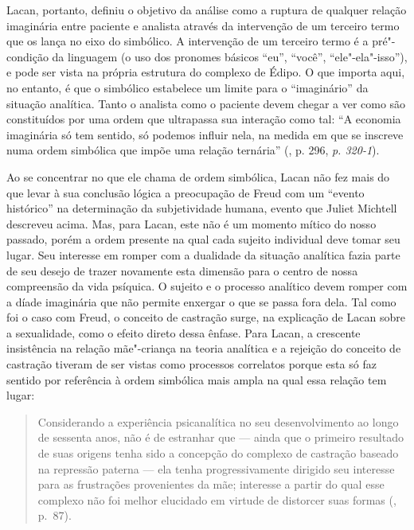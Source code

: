 Lacan, portanto, definiu o objetivo da análise como a ruptura de
qualquer relação imaginária entre paciente e analista através da
intervenção de um terceiro termo que os lança no eixo do simbólico. A
intervenção de um terceiro termo é a pré"-condição da linguagem (o uso
dos pronomes básicos ``eu'', ``você'', ``ele"-ela"-isso''), e pode ser
vista na própria estrutura do complexo de Édipo. O que importa aqui, no
entanto, é que o simbólico estabelece um limite para o ``imaginário'' da
situação analítica. Tanto o analista como o paciente devem chegar a ver
como são constituídos por uma ordem que ultrapassa sua interação como
tal: ``A economia imaginária só tem sentido, só podemos influir nela, na
medida em que se inscreve numa ordem simbólica que impõe uma relação
ternária'' (, p. 296, \emph{p. 320-1}).

Ao se concentrar no que ele chama de ordem simbólica, Lacan não fez mais
do que levar à sua conclusão lógica a preocupação de Freud com um
``evento histórico'' na determinação da subjetividade humana, evento que
Juliet Michtell descreveu acima. Mas, para Lacan, este não é um momento
mítico do nosso passado, porém a ordem presente na qual cada sujeito
individual deve tomar seu lugar. Seu interesse em romper com a dualidade
da situação analítica fazia parte de seu desejo de trazer novamente esta
dimensão para o centro de nossa compreensão da vida psíquica. O sujeito
e o processo analítico devem romper com a díade imaginária que não
permite enxergar o que se passa fora dela. Tal como foi o caso com
Freud, o conceito de castração surge, na explicação de Lacan sobre a
sexualidade, como o efeito direto dessa ênfase. Para Lacan, a crescente
insistência na relação mãe"-criança na teoria analítica e a rejeição do
conceito de castração tiveram de ser vistas como processos correlatos
porque esta só faz sentido por referência à ordem simbólica mais ampla
na qual essa relação tem lugar:

\begin{quote}
Considerando a experiência psicanalítica no seu desenvolvimento ao longo
de sessenta anos, não é de estranhar que --- ainda que o primeiro
resultado de suas origens tenha sido a concepção do complexo de
castração baseado na repressão paterna --- ela tenha progressivamente
dirigido seu interesse para as frustrações provenientes da mãe;
interesse a partir do qual esse complexo não foi melhor elucidado em
virtude de distorcer suas formas (, p.~87).
\end{quote}

